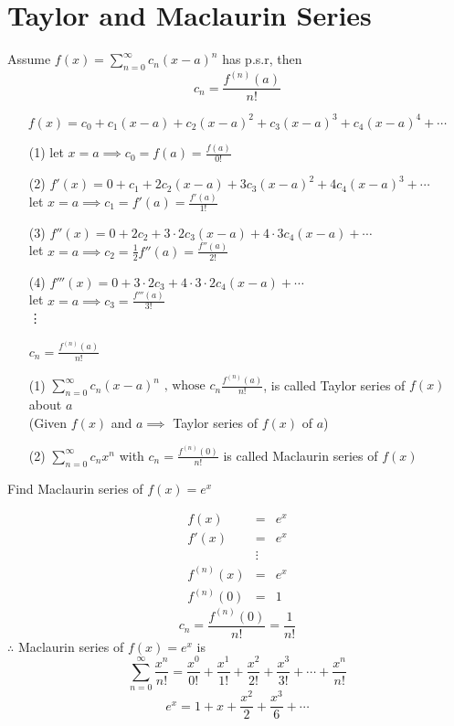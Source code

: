 \section{Taylor and Maclaurin Series}
\begin{theorem}
Assume \(\displaystyle f(x) = \sum^{\infty}_{n = 0} c_n (x - a)^n\) has p.s.r, then 
\[\displaystyle c_n = \frac{f^{(n)}(a)}{n!}\]
\end{theorem}
\[\displaystyle f(x) = c_0 + c_1 (x - a) + c_2 (x - a)^2 + c_3 (x - a)^3 + c_4 (x - a)^4 + \cdots\]
\begin{itemize}
\item[(1)] let \(x = a \implies \displaystyle c_0 = f(a) = \frac{f(a)}{0!}\)
\item[(2)] \(\displaystyle f'(x) = 0 + c_1 + 2c_2(x - a) + 3c_3(x - a)^2 + 4c_4(x - a)^3 + \cdots\)\\
let \(x = a \implies \displaystyle c_1 = f'(a) = \frac{f'(a)}{1!}\)
\item[(3)] \(\displaystyle f''(x) = 0 + 2c_2 + 3 \cdot 2 c_3(x - a) + 4 \cdot 3 c_4(x - a) + \cdots\)\\
let \(x = a \implies \displaystyle c_2 = \frac{1}{2} f''(a) = \frac{f''(a)}{2!}\)
\item[(4)] \(\displaystyle f'''(x) = 0 + 3 \cdot 2 c_3 + 4 \cdot 3 \cdot 2 c_4(x - a) + \cdots\)\\
let \(x = a \implies \displaystyle c_3 = \frac{f'''(a)}{3!}\)\\
\vdots
\item[] \(\displaystyle c_n = \frac{f^{(n)}(a)}{n!}\)
\end{itemize}
\begin{defn}
\begin{itemize}
\item[(1)] \(\displaystyle \sum^{\infty}_{n = 0} c_n (x - a)^n \text{ , whose } c_n \frac{f^{(n)}(a)}{n!}\), is called Taylor series of \(f(x)\) about \(a\)\\
(Given \(f(x)\) and \(a \implies\) Taylor series of \(f(x)\) of \(a\))
\item[(2)] \(\displaystyle \sum^{\infty}_{n = 0} c_nx^n\) with \(\displaystyle c_n = \frac{f^{(n)}(0)}{n!}\) is called Maclaurin series of \(f(x)\)\\
\end{itemize}
\end{defn}
\begin{eg}
Find Maclaurin series of \(\displaystyle f(x) = e^x\)

\soln
\[\begin{array}{rcl}
f(x) & = & e^x\\
f'(x) & = & e^x\\
& \vdots &\\
f^{(n)}(x) & = & e^x\\
f^{(n)}(0) & = & 1
\end{array}\]
\[\displaystyle c_n  = \frac{f^{(n)}(0)}{n!} = \frac{1}{n!}\]
\(\therefore\) Maclaurin series of \(f(x) = e^x\) is 
\[\displaystyle \sum^{\infty}_{n = 0} \frac{x^n}{n!} = \frac{x^0}{0!} + \frac{x^1}{1!} + \frac{x^2}{2!} + \frac{x^3}{3!} + \cdots + \frac{x^n}{n!}\]
\[e^x = 1 + x + \frac{x^2}{2} + \frac{x^3}{6} + \cdots\]
\end{eg}
